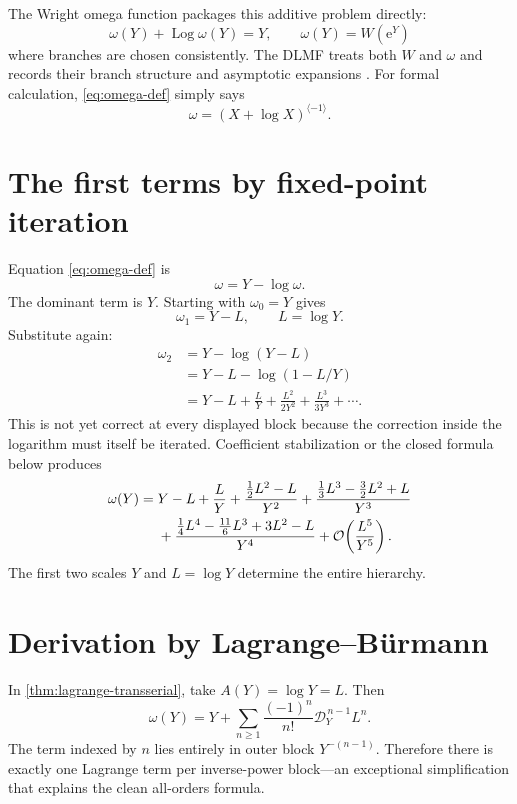 \documentclass[11pt,oneside]{book}
\theoremstyle{definition}
\theoremstyle{remark}
\DeclareMathOperator{\Log}{Log}
\newcommand{\e}{\mathrm e}
\newcommand{\D}{\mathcal D}
\newcommand{\bigO}{\mathcal O}
\newcommand{\compinv}{^{\langle-1\rangle}}
\begin{document}
The Wright omega function packages this additive problem directly:
\begin{equation}\label{eq:omega-def}
 \omega(Y)+\Log\omega(Y)=Y,
 \qquad
 \omega(Y)=W(\e^Y)
\end{equation}
where branches are chosen consistently.  The DLMF treats both $W$ and
$\omega$ and records their branch structure and asymptotic expansions
\cite{DLMF413}.  For formal calculation, \eqref{eq:omega-def} simply says
\begin{equation}\label{eq:omega-inverse}
 \omega=(X+\log X)\compinv.
\end{equation}

\section{The first terms by fixed-point iteration}
Equation \eqref{eq:omega-def} is
\begin{equation}\label{eq:omega-fixed}
 \omega=Y-\log\omega.
\end{equation}
The dominant term is $Y$.  Starting with $\omega_0=Y$ gives
\[
 \omega_1=Y-L,
 \qquad L=\log Y.
\]
Substitute again:
\begin{align*}
 \omega_2
 &=Y-\log(Y-L)\\
 &=Y-L-\log(1-L/Y)\\
 &=Y-L+\frac{L}{Y}+\frac{L^2}{2Y^2}
   +\frac{L^3}{3Y^3}+\cdots.
\end{align*}
This is not yet correct at every displayed block because the correction inside
the logarithm must itself be iterated.  Coefficient stabilization or the
closed formula below produces
\begin{align}\label{eq:omega-first-terms}
 \omega(Y)={}&Y-L+\frac{L}{Y}
 +\frac{\frac12L^2-L}{Y^2}
 +\frac{\frac13L^3-\frac32L^2+L}{Y^3}\notag\\
 &+\frac{\frac14L^4-\frac{11}{6}L^3+3L^2-L}{Y^4}
 +\bigO\!\left(\frac{L^5}{Y^5}\right).
\end{align}
The first two scales $Y$ and $L=\log Y$ determine the entire hierarchy.

\section{Derivation by Lagrange--B\"urmann}
In \cref{thm:lagrange-transserial}, take $A(Y)=\log Y=L$.  Then
\begin{equation}\label{eq:omega-lagrange}
 \omega(Y)
 =Y+\sum_{n\ge1}\frac{(-1)^n}{n!}
 \D_Y^{\,n-1}L^n.
\end{equation}
The term indexed by $n$ lies entirely in outer block $Y^{-(n-1)}$.  Therefore
there is exactly one Lagrange term per inverse-power block---an exceptional
simplification that explains the clean all-orders formula.
\end{document}
